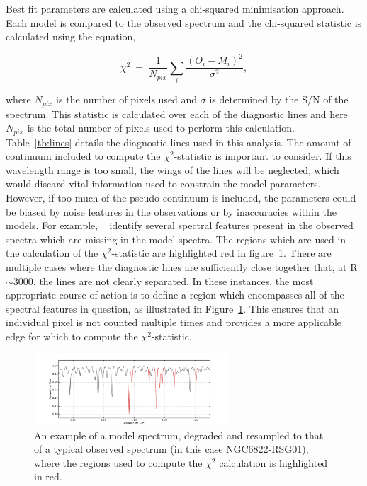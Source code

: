 Best fit parameters are calculated using a chi-squared minimisation approach.
Each model is compared to the observed spectrum
and the chi-squared statistic is calculated using the equation,

\begin{equation}
    \chi^{2}~=~\frac{1}{N_{pix}}\sum\limits_{i}{\frac{(O_{i} - M_{i})^{2}}{\sigma^{2}}},
\end{equation}

where $N_{pix}$ is the number of pixels used and
$\sigma$ is determined by the S/N of the spectrum.
This statistic is calculated over each of the diagnostic lines and here $N_{pix}$ is the total number of pixels used to perform this calculation.
Table~\ref{tb:lines} details the diagnostic lines used in this analysis.
The amount of continuum included to compute the $\chi^{2}$-statistic is important to consider.
If this wavelength range is too small, the wings of the lines will be neglected,
which would discard vital information used to constrain the model parameters.
However, if too much of the pseudo-continuum is included, the parameters could be biased by noise features in the observations or by inaccuracies within the models.
For example,
~\cite{2014PhDT.........G} identify several spectral features present in the observed spectra which are missing in the model spectra.
The regions which are used in the calculation of the $\chi^{2}$-statistic are highlighted red in
figure~\ref{fig:lines}.
There are multiple cases where the diagnostic lines are sufficiently close together that, at R$\sim$3000,
the lines are not clearly separated.
In these instances, the most appropriate course of action is to define a region which encompasses all of the spectral features in question,
as illustrated in Figure~\ref{fig:lines}.
This ensures that an individual pixel is not counted multiple times and provides a more applicable edge for which to compute the $\chi^{2}$-statistic.

\begin{figure}
 \centering
 \includegraphics[width=0.65\textwidth]{JAnal/Diag-lines}
 \caption[Diagnostic lines]{
An example of a model spectrum, degraded and resampled to that of a typical observed spectrum (in this case NGC6822-RSG01), where the regions used to compute the $\chi^{2}$ calculation is highlighted in red.\label{fig:lines}
         }
\end{figure}

